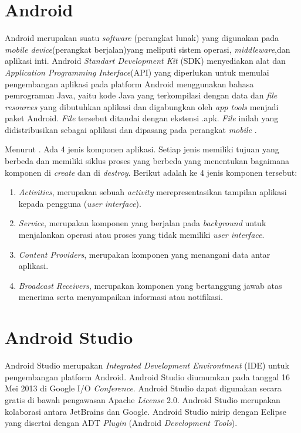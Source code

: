 \section{Android}
Android merupakan suatu \textit{software} (perangkat lunak) yang digunakan pada \textit{mobile device}(perangkat berjalan)yang meliputi sistem operasi, \textit{middleware},dan aplikasi inti. Android \textit{Standart Development Kit} (SDK) menyediakan alat dan \textit{Application Programming Interface}(API) yang diperlukan untuk memulai pengembangan aplikasi pada platform Android menggunakan bahasa pemrograman Java, yaitu kode Java yang terkompilasi dengan data dan \textit{file resources} yang dibutuhkan aplikasi dan digabungkan oleh \textit{app tools} menjadi paket Android. \textit{File} tersebut ditandai dengan ekstensi .apk. \textit{File} inilah yang didistribusikan sebagai aplikasi dan dipasang pada perangkat \textit{mobile} \citep{nasution2018perancangan}.

\par Menurut \citep{shaheen2017android}. Ada 4 jenis komponen aplikasi. Setiap jenis memiliki tujuan yang berbeda dan memiliki siklus proses yang berbeda yang menentukan bagaimana komponen di \textit{create} dan di \textit{destroy}. Berikut adalah ke 4 jenis komponen tersebut:

\begin{enumerate}
\item \textit{Activities}, merupakan sebuah \textit{activity} merepresentasikan tampilan aplikasi kepada pengguna (\textit{user interface}).
\item \textit{Service}, merupakan komponen yang berjalan pada \textit{background} untuk menjalankan operasi atau proses yang tidak memiliki \textit{user interface}.
\item \textit{Content Providers}, merupakan komponen yang menangani data antar aplikasi.
\item \textit{Broadcast Receivers}, merupakan komponen yang bertanggung jawab atas menerima serta menyampaikan informasi atau notifikasi.
\end{enumerate}

\section{Android Studio}
Android Studio merupakan \textit{Integrated Development Environtment} (IDE) untuk pengembangan platform Android. Android Studio diumumkan pada tanggal 16 Mei 2013 di Google I/O \textit{Conference}. Android Studio dapat digunakan secara gratis di bawah pengawasan Apache \textit{License} 2.0. Android Studio merupakan kolaborasi antara JetBrains dan Google. Android Studio mirip dengan Eclipse yang disertai dengan ADT \textit{Plugin} (Android \textit{Development Tools})\citep{craig2015learn}.

